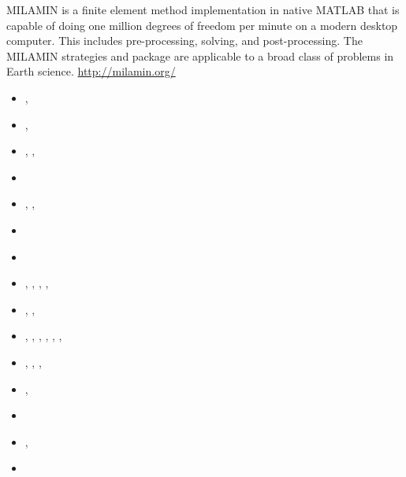MILAMIN is a finite element method implementation in native MATLAB that is capable 
of doing one million degrees of freedom per minute on a modern desktop computer. 
This includes pre-processing, solving, and post-processing. The MILAMIN strategies and 
package are applicable to a broad class of problems in Earth science. \url{http://milamin.org/}

\begin{small}
\begin{itemize}
\item[\twothousandeight]       \textcite{daks08},  \textcite{scdk08}
\item[\twothousandnine]        \textcite{gogk09},  \textcite{kalb09}
\item[\twothousandten]         \textcite{krda10},  \textcite{kaus10},  \textcite{dekc10}
\item[\twothousandeleven]      \textcite{yakm11}
\item[\twothousandtwelve]      \textcite{gebk12},  \textcite{rukb12},  \textcite{thka12}
\item[\twothousandthirteen]    \textcite{scpo13}
\item[\twothousandfourteen]    \textcite{jobk14}
\item[\twothousandfifteen]     \textcite{lukz15},  \textcite{gehm15},  \textcite{baka15}, 
                               \textcite{thkp15},  \textcite{musd15}
\item[\twothousandsixteen]     \textcite{jads16},  \textcite{maka16},  \textcite{cakp16}
\item[\twothousandeighteen]    \textcite{dusd18},  \textcite{jasc18},  \textcite{jadg18},
                               \textcite{comj18},  \textcite{jens18},  \textcite{rabw18},
                               \textcite{chsm18}
\item[\twothousandnineteen]    \textcite{sifg19},  \textcite{baba19},  \textcite{sogh19},  
                               \textcite{anpa19}
\item[\twothousandtwenty]      \textcite{hube20},  \textcite{peaa20}
\item[\twothousandtwentytwo]   \textcite{maly22}
\item[\twothousandtwentythree] \textcite{lilm23},  \textcite{rapa23} 
\item[\twothousandtwentyfour]  \textcite{pexc24} 
\end{itemize}
\end{small}



